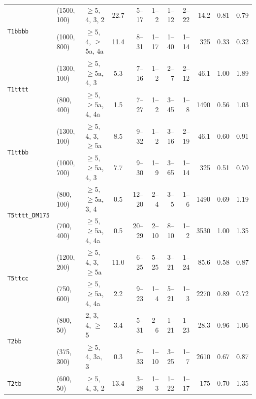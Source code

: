 \begin{table}[!t]
{\begin{tabular}{ lllcrrrrrcc }
      \multirow{2}{*}{\texttt{T1bbbb}}                    
    & (1500, 100) & $\geq$5, 4, 3, 2         &            22.7            & 5--17  & 1--2     & 1--12  & 2--22 & 14.2 & 0.81 & 0.79 \\
    & (1000, 800) & $\geq$5, 4, $\geq$5a, 4a & \phantom{1}11.4 & 8--31  & 1--17    & 1--40  & 1--14 & 325  & 0.33 & 0.32 \\ [0.5ex]
      \multirow{2}{*}{\texttt{T1tttt}}                    
    & (1300, 100) & $\geq$5, $\geq$5a, 4, 3  & \phantom{1}5.3  & 7--16  & 1--2     & 2--7   & 2--12 & 46.1 & 1.00 & 1.89 \\
    & (800, 400)  & $\geq$5, $\geq$5a, 4, 4a & \phantom{1}1.5  & 7--27  & 1--2     & 3--45  & 1--8  & 1490 & 0.56 & 1.03 \\ [0.5ex]
      \multirow{2}{*}{\texttt{T1ttbb}}                    
    & (1300, 100) & $\geq$5, 4, 3, $\geq$5a  & \phantom{1}8.5  & 9--32  & 1--2     & 3--16  & 2--19 & 46.1 & 0.60 & 0.91 \\
    & (1000, 700) & $\geq$5, $\geq$5a, 4, 3  & \phantom{1}7.7  & 9--30  & 1--9     & 3--65  & 1--14 & 325  & 0.51 & 0.70 \\ [0.5ex]
      \multirow{2}{*}{\texttt{T5tttt\_DM175}}             
    & (800, 100)  & $\geq$5, $\geq$5a, 3, 4  & \phantom{1}0.5  & 12--20 & 2--4     & 3--5   & 1--6  & 1490 & 0.69 & 1.19 \\
    & (700, 400)  & $\geq$5, $\geq$5a, 4, 4a & \phantom{1}0.5  & 20--29 & 2--10    & 8--10  & 1--2  & 3530 & 1.00 & 1.35 \\ [0.5ex]
      \multirow{2}{*}{\texttt{T5ttcc}}                    
    & (1200, 200) & $\geq$5, 4, 3, $\geq$5a  & \phantom{1}11.0 & 6--25  & 5--25    & 3--21  & 1--24 & 85.6 & 0.58 & 0.87 \\
    & (750, 600)  & $\geq$5, $\geq$5a, 4, 4a & \phantom{1}2.2  & 9--23  & 1--4     & 5--21  & 1--3  & 2270 & 0.89 & 0.72 \\ [0.5ex]
      \multirow{2}{*}{\texttt{T2bb}}                      
    & (800, 50)   & 2, 3, 4, $\geq$5         & \phantom{1}3.4  & 5--31  & 2--6     & 1--21  & 1--23 & 28.3 & 0.96 & 1.06 \\
    & (375, 300)  & $\geq$5, 4, 3a, 3        & \phantom{1}0.3  & 8--33  & 1--10    & 3--25  & 1--7  & 2610 & 0.67 & 0.87 \\ [0.5ex]
      \multirow{2}{*}{\texttt{T2tb}}                      
    & (600, 50)   & $\geq$5, 4, 3, 2         & \phantom{1}13.4 & 3--28  & 1--3     & 1--22  & 1--17 & 175  & 0.70 & 1.35 \\

\end{tabular}}
\end{table}
